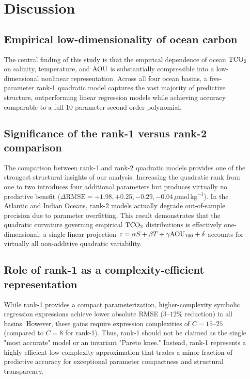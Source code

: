 \section{Discussion}

\subsection{Empirical low-dimensionality of ocean carbon}
The central finding of this study is that the empirical dependence of ocean $\mathrm{TCO_2}$ on salinity, temperature, and $\mathrm{AOU}$ is substantially compressible into a low-dimensional nonlinear representation. Across all four ocean basins, a five-parameter rank-1 quadratic model captures the vast majority of predictive structure, outperforming linear regression models while achieving accuracy comparable to a full 10-parameter second-order polynomial.

\subsection{Significance of the rank-1 versus rank-2 comparison}
The comparison between rank-1 and rank-2 quadratic models provides one of the strongest structural insights of our analysis. Increasing the quadratic rank from one to two introduces four additional parameters but produces virtually no predictive benefit ($\Delta\mathrm{RMSE} = +1.98, +0.25, -0.29, -0.04\,\mu\mathrm{mol}\,\mathrm{kg}^{-1}$). In the Atlantic and Indian Oceans, rank-2 models actually degrade out-of-sample precision due to parameter overfitting. This result demonstrates that the quadratic curvature governing empirical $\mathrm{TCO_2}$ distributions is effectively one-dimensional: a single linear projection $z = \alpha S + \beta T + \gamma \mathrm{AOU}_{100} + \delta$ accounts for virtually all non-additive quadratic variability.

\subsection{Role of rank-1 as a complexity-efficient representation}
While rank-1 provides a compact parameterization, higher-complexity symbolic regression expressions achieve lower absolute RMSE ($3$--$12\%$ reduction) in all basins. However, these gains require expression complexities of $C=15$--$25$ (compared to $C=8$ for rank-1). Thus, rank-1 should not be claimed as the single "most accurate" model or an invariant "Pareto knee." Instead, rank-1 represents a highly efficient low-complexity approximation that trades a minor fraction of predictive accuracy for exceptional parameter compactness and structural transparency.

